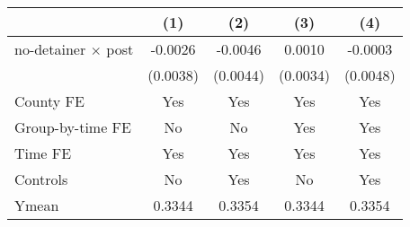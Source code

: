 {
\def\sym#1{\ifmmode^{#1}\else\(^{#1}\)\fi}
\begin{tabular}{l*{4}{c}}
\hline\hline
                    &\multicolumn{1}{c}{(1)}         &\multicolumn{1}{c}{(2)}         &\multicolumn{1}{c}{(3)}         &\multicolumn{1}{c}{(4)}         \\
\hline
no-detainer $\times$ post&     -0.0026         &     -0.0046         &      0.0010         &     -0.0003         \\
                    &    (0.0038)         &    (0.0044)         &    (0.0034)         &    (0.0048)         \\
[1em]
County FE           &         Yes         &         Yes         &         Yes         &         Yes         \\
[1em]
Group-by-time FE    &          No         &          No         &         Yes         &         Yes         \\
[1em]
Time FE             &         Yes         &         Yes         &         Yes         &         Yes         \\
[1em]
Controls            &          No         &         Yes         &          No         &         Yes         \\
\hline
Ymean               &      0.3344         &      0.3354         &      0.3344         &      0.3354         \\
\hline\hline
\end{tabular}
}
